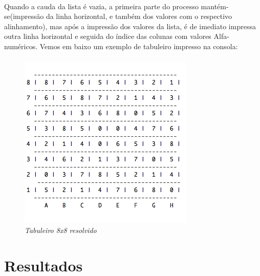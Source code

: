 \documentclass{llncs}
\begin{document}
\paragraph*{}
Quando a cauda da lista \'{e} vazia, a primeira parte do processo mant\'{e}m-se(impress\~{a}o da linha horizontal, e tamb\'{e}m dos valores com o respectivo alinhamento), mas ap\'{o}s a impress\~{a}o dos valores da lista, \'{e} de imediato impressa outra linha horizontal e seguida do \'{i}ndice das colunas com valores Alfa-num\'{e}ricos. 
Vemos em baixo um exemplo de tabuleiro impresso na consola:
\paragraph*{}


\begin{figure}[h!]
\begin{center}
\includegraphics[scale=0.5]{tabuleiro.png}
\caption{\textit{Tabuleiro 8x8 resolvido}}
\label{fig:jogo_original}
\end{center}
\end{figure}







\section{Resultados}
\end{document}
